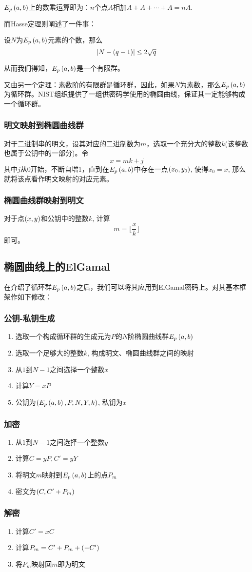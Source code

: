 $E_p\left( {a, b}\right)$上的数乘运算即为：$n$个点$A$相加$A+A+\cdots +A=nA$.\par
而Hasse定理则阐述了一件事：
\begin{theorem}
设$N$为$E_p\left( {a,b}\right)$元素的个数，那么
\begin{equation}
\left| N-\left( {q-1}\right) \right|\leq 2\sqrt{q}
\end{equation}
\end{theorem}

从而我们得知，$E_p\left( {a, b}\right)$是一个有限群。\par
又由另一个定理：素数阶的有限群是循环群，因此，如果$N$为素数，那么$E_p\left( {a, b}\right)$为循环群。NIST组织提供了一组供密码学使用的椭圆曲线，保证其一定能够构成一个循环群。
\subsubsection{明文映射到椭圆曲线群}
对于二进制串的明文，设其对应的二进制数为$m$，选取一个充分大的整数$k$(该整数也属于公钥中的一部分)。令
\[x=mk+j\]
其中$j$从0开始，不断自增1，直到在$E_p\left( {a, b}\right)$中存在一点$\left( {x_0, y_0}\right)$, 使得$x_0=x$, 那么就将该点看作明文映射的对应元素。
\subsubsection{椭圆曲线群映射到明文}
对于点$\left( {x, y}\right)$和公钥中的整数$k$, 计算
\[m=\lfloor \frac{x}{k} \rfloor\]
即可。
\subsection{椭圆曲线上的ElGamal}
在介绍了循环群$E_p\left( {a, b}\right)$之后，我们可以将其应用到ElGamal密码上。对其基本框架作如下修改：
\subsubsection{公钥-私钥生成}
\begin{enumerate}
	\item 选取一个构成循环群的生成元为$P$的$N$阶椭圆曲线群$E_p\left( {a, b}\right)$
	\item 选取一个足够大的整数$k$, 构成明文、椭圆曲线群之间的映射
	\item 从$1$到$N-1$之间选择一个整数$x$
	\item 计算$Y=xP$
	\item 公钥为$\left( {E_p\left( {a, b}\right), P, N, Y, k}\right)$, 私钥为$x$
\end{enumerate}
\subsubsection{加密}
\begin{enumerate}
	\item 从$1$到$N-1$之间选择一个整数$y$
	\item 计算$C=yP, C'=yY$
	\item 将明文$m$映射到$E_p\left( {a, b}\right)$上的点$P_m$
	\item 密文为$\left( {C, C'+P_m}\right)$
\end{enumerate}
\subsubsection{解密}
\begin{enumerate}
	\item 计算$C'=xC$
	\item 计算$P_m=C'+P_m+\left( {-C'}\right)$
	\item 将$P_m$映射回$m$即为明文
\end{enumerate}